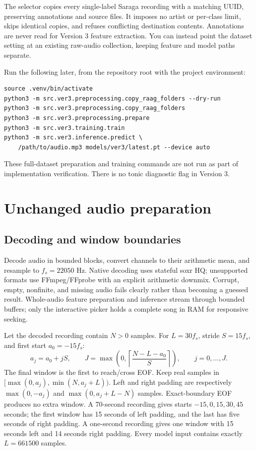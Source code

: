 \documentclass[11pt,a4paper]{article}
\begin{document}
The selector copies every single-label Saraga recording with a matching UUID,
preserving annotations and source files. It imposes no artist or per-class limit,
skips identical copies, and refuses conflicting destination contents. Annotations
are never read for Version 3 feature extraction. You can instead point the dataset
setting at an existing raw-audio collection, keeping feature and model paths separate.

Run the following later, from the repository root with the project environment:
\begin{lstlisting}
source .venv/bin/activate
python3 -m src.ver3.preprocessing.copy_raag_folders --dry-run
python3 -m src.ver3.preprocessing.copy_raag_folders
python3 -m src.ver3.preprocessing.prepare
python3 -m src.ver3.training.train
python3 -m src.ver3.inference.predict \
    /path/to/audio.mp3 models/ver3/latest.pt --device auto
\end{lstlisting}
These full-dataset preparation and training commands are not run as part of
implementation verification. There is no tonic diagnostic flag in Version 3.

\section{Unchanged audio preparation}
\subsection{Decoding and window boundaries}
Decode audio in bounded blocks, convert channels to their arithmetic mean, and
resample to $f_s=22050$ Hz. Native decoding uses stateful soxr HQ; unsupported
formats use FFmpeg/FFprobe with an explicit arithmetic downmix. Corrupt, empty,
nonfinite, and missing audio fails clearly rather than becoming a guessed result.
Whole-audio feature preparation and inference stream through bounded buffers;
only the interactive picker holds a complete song in RAM for responsive seeking.

Let the decoded recording contain $N>0$ samples. For $L=30f_s$, stride $S=15f_s$,
and first start $a_0=-15f_s$:
\[
a_j=a_0+jS,\qquad
J=\max\left(0,\left\lceil\frac{N-L-a_0}{S}\right\rceil\right),\qquad j=0,\ldots,J.
\]
The final window is the first to reach/cross EOF. Keep real samples in
$[\max(0,a_j),\min(N,a_j+L))$. Left and right padding are respectively
$\max(0,-a_j)$ and $\max(0,a_j+L-N)$ samples. Exact-boundary EOF produces no extra
window. A 70-second recording gives starts $-15,0,15,30,45$ seconds; the first
window has 15 seconds of left padding, and the last has five seconds of right
padding. A one-second recording gives one window with 15 seconds left and 14
seconds right padding. Every model input contains exactly $L=661500$ samples.
\end{document}
